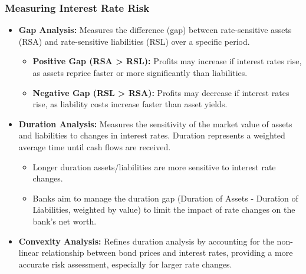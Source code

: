\subsubsection{Measuring Interest Rate Risk}
\begin{itemize}
    \item \textbf{Gap Analysis:} Measures the difference (gap) between rate-sensitive assets (RSA) and rate-sensitive liabilities (RSL) over a specific period.
        \begin{itemize}
            \item \textbf{Positive Gap (RSA > RSL):} Profits may increase if interest rates rise, as assets reprice faster or more significantly than liabilities.
            \item \textbf{Negative Gap (RSL > RSA):} Profits may decrease if interest rates rise, as liability costs increase faster than asset yields.
        \end{itemize}
    \item \textbf{Duration Analysis:} Measures the sensitivity of the market value of assets and liabilities to changes in interest rates. Duration represents a weighted average time until cash flows are received.
        \begin{itemize}
            \item Longer duration assets/liabilities are more sensitive to interest rate changes.
            \item Banks aim to manage the duration gap (Duration of Assets - Duration of Liabilities, weighted by value) to limit the impact of rate changes on the bank's net worth.
        \end{itemize}
    \item \textbf{Convexity Analysis:} Refines duration analysis by accounting for the non-linear relationship between bond prices and interest rates, providing a more accurate risk assessment, especially for larger rate changes.
\end{itemize}

